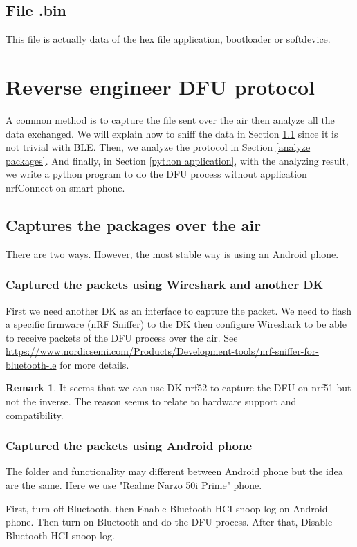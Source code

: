 \documentclass{article}
\theoremstyle{plain}
\theoremstyle{definition}
\newtheorem{remark}{Remark}
\numberwithin{equation}{section}
\begin{document}
\subsection{File .bin}
This file is actually data of the hex file application, bootloader or softdevice.

\section{Reverse engineer DFU protocol}\label{reverse dfu}
A common method is to capture the file sent over the air then analyze all the data exchanged. We will explain how to sniff the data in Section \ref{capture packages} since it is not trivial with BLE. Then, we analyze the protocol in Section \ref{analyze packages}. And finally, in Section \ref{python application}, with the analyzing result, we write a python program to do the DFU process without application nrfConnect on smart phone.
\subsection{Captures the packages over the air}\label{capture packages}
There are two ways. However, the most stable way is using an Android phone.
\subsubsection{Captured the packets using Wireshark and another DK}
First we need another DK as an interface to capture the packet. We need to flash a specific firmware (nRF Sniffer) to the DK then configure Wireshark to be able to receive packets of the DFU process over the air. See \url{https://www.nordicsemi.com/Products/Development-tools/nrf-sniffer-for-bluetooth-le} for more details.

\begin{remark}
	It seems that we can use DK nrf52 to capture the DFU on nrf51 but not the inverse. The reason seems to relate to hardware support and compatibility.
\end{remark}
\subsubsection{Captured the packets using Android phone}
The folder and functionality may different between Android phone but the idea are the same. Here we use "Realme Narzo 50i Prime" phone.

First, turn off Bluetooth, then Enable Bluetooth HCI snoop log on Android phone. Then turn on Bluetooth and do the DFU process. After that, Disable Bluetooth HCI snoop log.
\end{document}
